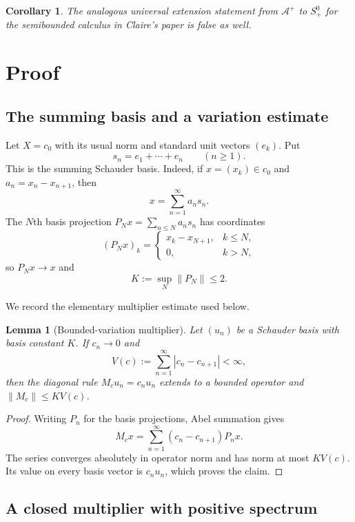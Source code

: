 \documentclass[11pt]{article}
\newtheorem{lemma}[theorem]{Lemma}
\newtheorem{corollary}[theorem]{Corollary}
\theoremstyle{remark}
\newcommand{\A}{\mathcal A}
\newcommand{\norm}[1]{\lVert #1\rVert}
\begin{document}
\begin{corollary}\label{cor:halfline}
The analogous universal extension statement from $\A^+$ to $S^0_+$ for the
semibounded calculus in Claire's paper is false as well.
\end{corollary}

\section{Proof}

\subsection{The summing basis and a variation estimate}

Let $X=c_0$ with its usual norm and standard unit vectors $(e_k)$.  Put
\[
 s_n=e_1+\cdots+e_n \qquad(n\geq1).
\]
This is the summing Schauder basis.  Indeed, if $x=(x_k)\in c_0$ and
$a_n=x_n-x_{n+1}$, then
\[
 x=\sum_{n=1}^\infty a_ns_n.
\]
The $N$th basis projection $P_Nx=\sum_{n\leq N}a_ns_n$ has coordinates
\[
 (P_Nx)_k=
 \begin{cases}x_k-x_{N+1},&k\leq N,\\0,&k>N,
 \end{cases}
\]
so $P_Nx\to x$ and
\begin{equation}\label{eq:basisconstant}
 K:=\sup_N\norm{P_N}\leq2.
\end{equation}

We record the elementary multiplier estimate used below.

\begin{lemma}[Bounded-variation multiplier]\label{lem:bv}
Let $(u_n)$ be a Schauder basis with basis constant $K$.  If $c_n\to0$ and
\[
 V(c):=\sum_{n=1}^\infty |c_n-c_{n+1}|<\infty,
\]
then the diagonal rule $M_cu_n=c_nu_n$ extends to a bounded operator and
$\norm{M_c}\leq K V(c)$.
\end{lemma}

\begin{proof}
Writing $P_n$ for the basis projections, Abel summation gives
\[
 M_cx=\sum_{n=1}^\infty(c_n-c_{n+1})P_nx.
\]
The series converges absolutely in operator norm and has norm at most
$KV(c)$.  Its value on every basis vector is $c_nu_n$, which proves the
claim.
\end{proof}

\subsection{A closed multiplier with positive spectrum}
\end{document}
